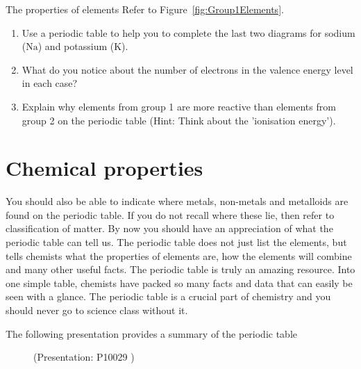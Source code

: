 


            

\begin{activity}{The properties of elements }
            \nopagebreak
            \label{m38757*uid798724}Refer to Figure~\ref{fig:Group1Elements}.
\label{m38757*id261630}\begin{enumerate}[noitemsep, label=\textbf{\arabic*}. ] 
            \label{m38757*uid136}\item Use a periodic table to help you to complete the last two diagrams for sodium ($\mathrm{Na}$) and potassium ($\mathrm{K}$).
\label{m38757*uid137}\item What do you notice about the number of electrons in the valence energy level in each case?
\label{m38757*uid138}\item Explain why elements from group 1 are more reactive than elements from group 2 on the periodic table (Hint: Think about the 'ionisation energy').
\end{enumerate}
        \par \end{activity}
\section{Chemical properties}
\label{m38757*eip-921}You should also be able to indicate where metals, non-metals and metalloids are found on the periodic table. If you do not recall where these lie, then refer to classification of matter. \label{m38757*eip-215}By now you should have an appreciation of what the periodic table can tell us. The periodic table does not just list the elements, but tells chemists what the properties of elements are, how the elements will combine and many other useful facts. The periodic table is truly an amazing resource. Into one simple table, chemists have packed so many facts and data that can easily be seen with a glance. The periodic table is a crucial part of chemistry and you should never go to science class without it. \label{m38757*eip-325}


The following presentation provides a summary of the periodic table
    \setcounter{subfigure}{0}
	\begin{figure}[H] %
    \label{m38757*slidesharemedia}\label{m38757*slideshareflash} { (Presentation:  P10029 )}
      \vspace{2pt}
    \vspace{.1in}
 \end{figure}       \par 
    \label{m38757*eip-572}


